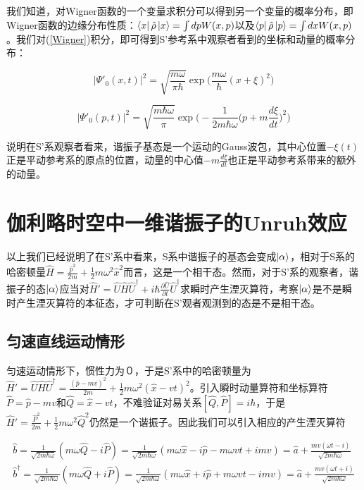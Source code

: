 \documentclass[a4paper]{article}
\begin{document}
        我们知道，对Wigner函数的一个变量求积分可以得到另一个变量的概率分布，即Wigner函数的边缘分布性质：$\bra{x}\hat{\rho}\ket{x}=\int dp W(x, p)$以及$\bra{p}\hat{\rho}\ket{p}=\int dx W(x, p)$。我们对(\ref{Wigner})积分，即可得到S'参考系中观察者看到的坐标和动量的概率分布：

        \begin{equation}
            |\Psi'_0(x,t)|^2 = \sqrt{\frac{m\omega}{\pi\hbar}} \exp\bigg(\frac{m\omega}{\hbar}(x+\xi)^2\bigg)
        \end{equation}

        \begin{equation}
            |\Psi'_0(p,t)|^2 = \sqrt{\frac{m\hbar\omega}{\pi}} \exp\biggl(-\frac{1}{2m\hbar\omega}\bigl(p+m\frac{d\xi}{dt}\bigr)^2\biggr)
        \end{equation}
        
        说明在S'系观察者看来，谐振子基态是一个运动的Gauss波包，其中心位置$-\xi(t)$正是平动参考系的原点的位置，动量的中心值$-m\frac{d\xi}{dt}$也正是平动参考系带来的额外的动量。



    \section{伽利略时空中一维谐振子的Unruh效应}

        以上我们已经说明了在S'系中看来，S系中谐振子的基态会变成$\ket{\alpha}$，相对于S系的哈密顿量$\hat{H}=\frac{\hat{p}^2}{2m}+\frac{1}{2}m\omega^2\hat{x}^2$而言，这是一个相干态。然而，对于S'系的观察者，谐振子的态$\ket{\alpha}$应当对$\hat{H}'=\hat{U}\hat{H}\hat{U}^\dagger+i\hbar\frac{\partial\hat{U}}{\partial t}\hat{U}^\dagger$求瞬时产生湮灭算符，考察$\ket{\alpha}$是不是瞬时产生湮灭算符的本征态，才可判断在S'观者观测到的态是不是相干态。

        \subsection{匀速直线运动情形}

            匀速运动情形下，惯性力为０，于是S'系中的哈密顿量为$\hat{H}'=\hat{U}\hat{H}\hat{U}^\dagger=\frac{(\hat{p}-mv)^2}{2m}+\frac{1}{2}m\omega^2(\hat{x}-vt)^2$。引入瞬时动量算符和坐标算符$\hat{P}=\hat{p}-mv$和$\hat{Q}=\hat{x}-vt$，不难验证对易关系$[\hat{Q},\hat{P}]=i\hbar$，于是$\hat{H}'=\frac{\hat{P}^2}{2m}+\frac{1}{2}m\omega^2\hat{Q}^2$仍然是一个谐振子。因此我们可以引入相应的产生湮灭算符

            \begin{equation}
                \begin{array}{lr}
                    \hat{b}=\frac{1}{\sqrt{2m\hbar\omega}}(m\omega\hat{Q}-i\hat{P})=\frac{1}{\sqrt{2m\hbar\omega}}(m\omega\hat{x}-i\hat{p}-m\omega vt+imv)=\hat{a}+\frac{mv(\omega t-i)}{\sqrt{2m\hbar\omega}} \\
                    \hat{b}^\dagger=\frac{1}{\sqrt{2m\hbar\omega}}(m\omega\hat{Q}+i\hat{P})=\frac{1}{\sqrt{2m\hbar\omega}}(m\omega\hat{x}+i\hat{p}+m\omega vt-imv)=\hat{a}+\frac{mv(\omega t+i)}{\sqrt{2m\hbar\omega}}
                \end{array}
            \end{equation}
\end{document}
